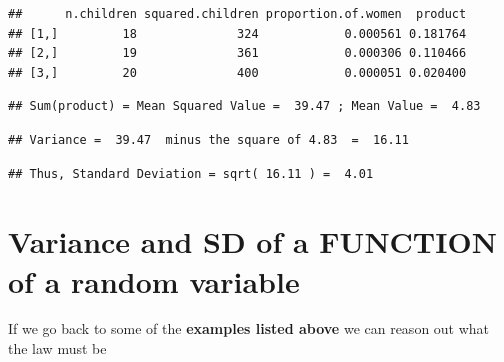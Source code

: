 \documentclass[]{book}
\begin{document}
\begin{verbatim}
##      n.children squared.children proportion.of.women  product
## [1,]         18              324            0.000561 0.181764
## [2,]         19              361            0.000306 0.110466
## [3,]         20              400            0.000051 0.020400
\end{verbatim}

\begin{verbatim}
## Sum(product) = Mean Squared Value =  39.47 ; Mean Value =  4.83
\end{verbatim}

\begin{verbatim}
## Variance =  39.47  minus the square of 4.83  =  16.11
\end{verbatim}

\begin{verbatim}
## Thus, Standard Deviation = sqrt( 16.11 ) =  4.01
\end{verbatim}

\hypertarget{variance-and-sd-of-a-function-of-a-random-variable}{%
\section{Variance and SD of a FUNCTION of a random variable}\label{variance-and-sd-of-a-function-of-a-random-variable}}

If we go back to some of the \textbf{examples listed above} we can reason out what the law must be
\end{document}
